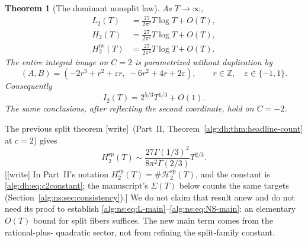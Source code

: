 \documentclass[11pt]{article}
\numberwithin{equation}{section}
\newtheorem{theorem}{Theorem}[section]
\theoremstyle{plain}
\theoremstyle{plain}
\theoremstyle{plain}
\theoremstyle{definition}
\theoremstyle{definition}
\theoremstyle{definition}
\theoremstyle{remark}
\newcommand{\Z}{\mathbb Z}\newcommand{\Q}{\mathbb Q}
\newcommand{\wtag}{\textup{[write]}}%
\newcommand{\Hsplit}{\mathcal H^{\mathrm{sp}}}
\newcommand{\NS}{\mathrm{ns}}\newcommand{\spc}{\mathrm{sp}}
\begin{document}
\begin{theorem}[The dominant nonsplit law]\label{alg:ns:thm:count-main}
As $T\to\infty$,
\begin{align}
L_2(T)&=\frac{27}{2\pi^2}T\log T+O(T),\label{alg:ns:eq:L-main}\\
H_2(T)&=\frac{27}{2\pi^2}T\log T+O(T),\label{alg:ns:eq:H-main}\\
H_2^{\NS}(T)&=\frac{27}{2\pi^2}T\log T+O(T).\label{alg:ns:eq:NS-main}
\end{align}
The entire integral image on $C=2$ is parametrized without duplication by
\begin{equation}\label{alg:ns:eq:curves-main}
(A,B)=(-2r^3+r^2+\varepsilon r,\ -6r^2+4r+2\varepsilon),
\qquad r\in\Z,\quad\varepsilon\in\{-1,1\}.
\end{equation}
Consequently
\begin{equation}\label{alg:ns:eq:I-main}
I_2(T)=2^{5/3}T^{1/3}+O(1).
\end{equation}
The same conclusions, after reflecting the second coordinate, hold on
$C=-2$.
\end{theorem}
The previous split theorem \wtag{}~(Part~II,
Theorem~\ref{alg:dh:thm:headline-count} at $c=2$) gives
\begin{equation}\label{alg:ns:eq:prior-split}
H_2^{\spc}(T)\sim
\frac{27\Gamma(1/3)^2}{8\pi^2\Gamma(2/3)}T^{2/3}.
\end{equation}
[\wtag{} In Part~II's notation $H_2^{\spc}(T)=\#\Hsplit_2(T)$, and the
constant is \eqref{alg:dh:eq:c2constant}; the manuscript's
$\Sigma(T)$ below counts the same targets
(Section~\ref{alg:ns:sec:consistency}).]
We do not claim that result anew and do not need its proof to establish
\eqref{alg:ns:eq:L-main}--\eqref{alg:ns:eq:NS-main}: an elementary $O(T)$ bound for
split fibers suffices. The new main term comes from the rational-plus-
quadratic sector, not from refining the split-family constant.
\end{document}
